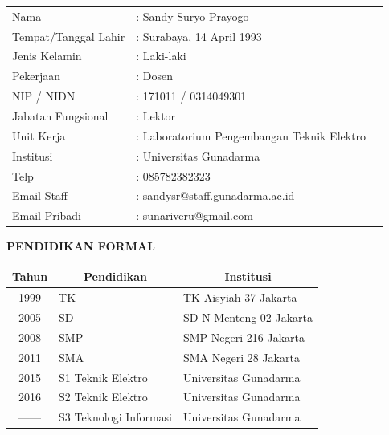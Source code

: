 \begin{table}[H]
	\label{tab:my-table}
	\begin{tabular}{lll}
		Nama & : Sandy Suryo Prayogo \\
		Tempat/Tanggal Lahir & : Surabaya, 14 April 1993  \\
		Jenis Kelamin & : Laki-laki \\
		Pekerjaan & : Dosen \\
		NIP / NIDN & : 171011 / 0314049301 \\
		Jabatan Fungsional & : Lektor \\
		Unit Kerja & : Laboratorium Pengembangan Teknik Elektro \\
		Institusi & : Universitas Gunadarma \\
		Telp & : 085782382323 \\
		Email Staff & : sandy\textunderscore sr@staff.gunadarma.ac.id \\
		Email  Pribadi& : sunariveru@gmail.com \\
 
	\end{tabular}
\end{table}


\vspace{8cm}
\noindent \textbf{PENDIDIKAN FORMAL}
\vspace{0.2cm}

\begin{table}[H]
		\centering
	\label{tab:my-table}
	\begin{longtable}{|c|l|p{7.5cm}|}
		\hline
		\textbf{Tahun} & \multicolumn{1}{c|}{\textbf{Pendidikan}} & \multicolumn{1}{c|}{\textbf{Institusi}} \\ \hline
		1999 & TK & TK Aisyiah 37 Jakarta \\ \hline
		2005 & SD & SD N Menteng 02 Jakarta\\ \hline
		2008 & SMP & SMP Negeri 216 Jakarta \\ \hline
		2011 & SMA & SMA Negeri 28 Jakarta \\ \hline
		2015 & S1   Teknik Elektro & Universitas Gunadarma         \\ \hline
		2016 & S2  Teknik Elektro & Universitas Gunadarma  \\ \hline
		------ & S3   Teknologi Informasi & Universitas Gunadarma \\ \hline
	\end{longtable}%
		\centering	
\end{table}

